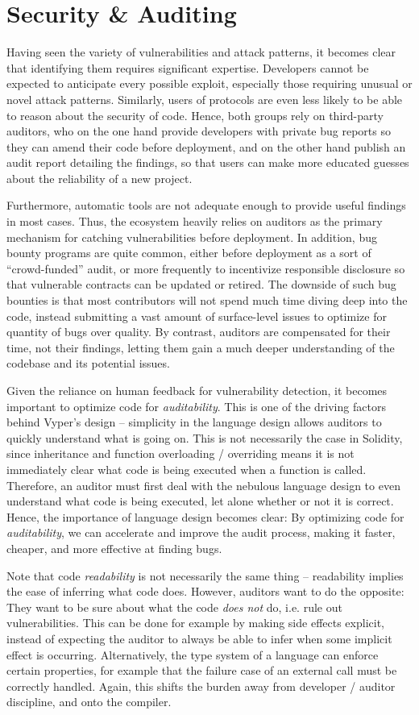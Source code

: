 \section{Security \& Auditing}
Having seen the variety of vulnerabilities and attack patterns, it becomes clear that identifying them requires significant expertise. Developers cannot be expected to anticipate every possible exploit, especially those requiring unusual or novel attack patterns. Similarly, users of protocols are even less likely to be able to reason about the security of code. Hence, both groups rely on third-party auditors, who on the one hand provide developers with private bug reports so they can amend their code before deployment, and on the other hand publish an audit report detailing the findings, so that users can make more educated guesses about the reliability of a new project.
\par
Furthermore, automatic tools are not adequate enough to provide useful findings in most cases. Thus, the ecosystem heavily relies on auditors as the primary mechanism for catching vulnerabilities before deployment. In addition, bug bounty programs are quite common, either before deployment as a sort of ``crowd-funded'' audit, or more frequently to incentivize responsible disclosure so that vulnerable contracts can be updated or retired. The downside of such bug bounties is that most contributors will not spend much time diving deep into the code, instead submitting a vast amount of surface-level issues to optimize for quantity of bugs over quality. By contrast, auditors are compensated for their time, not their findings, letting them gain a much deeper understanding of the codebase and its potential issues.
\par
Given the reliance on human feedback for vulnerability detection, it becomes important to optimize code for \textit{auditability}. This is one of the driving factors behind Vyper's design -- simplicity in the language design allows auditors to quickly understand what is going on. This is not necessarily the case in Solidity, since inheritance and function overloading / overriding means it is not immediately clear what code is being executed when a function is called. Therefore, an auditor must first deal with the nebulous language design to even understand what code is being executed, let alone whether or not it is correct. Hence, the importance of language design becomes clear: By optimizing code for \textit{auditability}, we can accelerate and improve the audit process, making it faster, cheaper, and more effective at finding bugs.
\par
Note that code \textit{readability} is not necessarily the same thing -- readability implies the ease of inferring what code does. However, auditors want to do the opposite: They want to be sure about what the code \textit{does not} do, i.e. rule out vulnerabilities. This can be done for example by making side effects explicit, instead of expecting the auditor to always be able to infer when some implicit effect is occurring. Alternatively, the type system of a language can enforce certain properties, for example that the failure case of an external call must be correctly handled. Again, this shifts the burden away from developer / auditor discipline, and onto the compiler.

